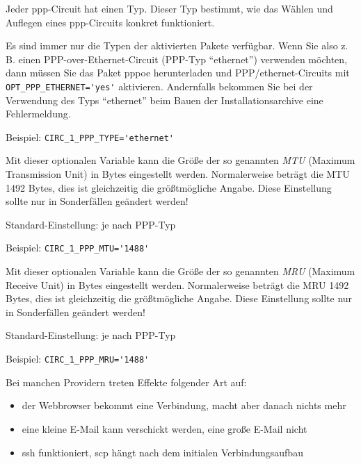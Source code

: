 \begin{description}


Jeder ppp-Circuit hat einen Typ. Dieser Typ bestimmt, wie das
Wählen und Auflegen eines ppp-Circuits konkret funktioniert.

Es sind immer nur die Typen der aktivierten Pakete verfügbar. Wenn Sie also
z.\,B. einen PPP-over-Ethernet-Circuit (PPP-Typ ``ethernet'') verwenden möchten,
dann müssen Sie das Paket pppoe herunterladen und PPP/ethernet-Circuits mit
\verb+OPT_PPP_ETHERNET='yes'+ aktivieren. Andernfalls bekommen Sie bei der
Verwendung des Typs ``ethernet'' beim Bauen der Installationsarchive eine
Fehlermeldung.

Beispiel: \verb+CIRC_1_PPP_TYPE='ethernet'+


Mit dieser optionalen Variable kann die Größe der so genannten \emph{MTU}
(Maximum Transmission Unit) in Bytes eingestellt werden. Normalerweise beträgt
die MTU 1492 Bytes, dies ist gleichzeitig die größtmögliche Angabe. Diese
Einstellung sollte nur in Sonderfällen geändert werden!

Standard-Einstellung: je nach PPP-Typ

Beispiel: \verb+CIRC_1_PPP_MTU='1488'+


Mit dieser optionalen Variable kann die Größe der so genannten \emph{MRU}
(Maximum Receive Unit) in Bytes eingestellt werden. Normalerweise beträgt
die MRU 1492 Bytes, dies ist gleichzeitig die größtmögliche Angabe. Diese
Einstellung sollte nur in Sonderfällen geändert werden!

Standard-Einstellung: je nach PPP-Typ

Beispiel: \verb+CIRC_1_PPP_MRU='1488'+


Bei manchen Providern treten Effekte folgender Art auf:
\begin{itemize}
\item der Webbrowser bekommt eine Verbindung, macht aber danach nichts mehr
\item eine kleine E-Mail kann verschickt werden, eine große E-Mail nicht
\item ssh funktioniert, scp hängt nach dem initialen Verbindungsaufbau
\end{itemize}


\end{description}
